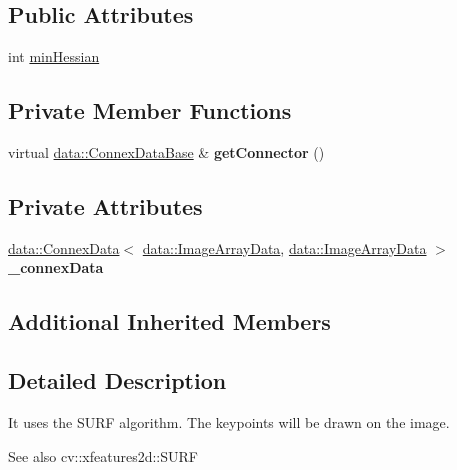 \subsection*{Public Attributes}
\begin{DoxyCompactItemize}
\item 
int \hyperlink{classfilter_1_1algos_1_1_surf_a10c6204bfde9712b2a3b322dcd32d6c8}{min\+Hessian}
\end{DoxyCompactItemize}
\subsection*{Private Member Functions}
\begin{DoxyCompactItemize}
\item 
\mbox{\label{classfilter_1_1algos_1_1_surf_af321ba4a0343b09f41342c204f08c29b}} 
virtual \hyperlink{classfilter_1_1data_1_1_connex_data_base}{data\+::\+Connex\+Data\+Base} \& {\bfseries get\+Connector} ()
\end{DoxyCompactItemize}
\subsection*{Private Attributes}
\begin{DoxyCompactItemize}
\item 
\mbox{\label{classfilter_1_1algos_1_1_surf_a6da9d8c68164923d5a831ac3d1be9137}} 
\hyperlink{classfilter_1_1data_1_1_connex_data}{data\+::\+Connex\+Data}$<$ \hyperlink{classfilter_1_1data_1_1_image_array_data}{data\+::\+Image\+Array\+Data}, \hyperlink{classfilter_1_1data_1_1_image_array_data}{data\+::\+Image\+Array\+Data} $>$ {\bfseries \+\_\+connex\+Data}
\end{DoxyCompactItemize}
\subsection*{Additional Inherited Members}


\subsection{Detailed Description}
It uses the S\+U\+RF algorithm. The keypoints will be drawn on the image. \begin{DoxySeeAlso}{See also}
cv\+::xfeatures2d\+::\+S\+U\+RF 
\end{DoxySeeAlso}


